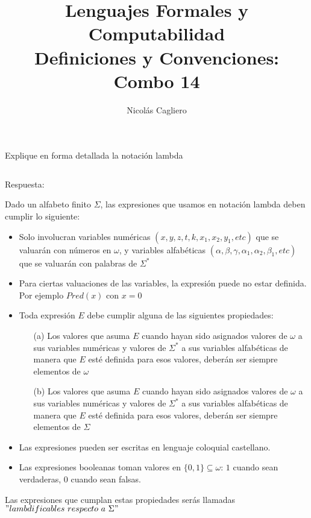 \documentclass{article}
\title{Lenguajes Formales y Computabilidad \\
        \large Definiciones y Convenciones: Combo 14 }
\author{Nicolás Cagliero}
\begin{document}
\maketitle

Explique en forma detallada la notación lambda

\(\)
\begin{center}
    Respuesta: 
    \(\)
\end{center}

Dado un alfabeto finito $\Sigma$, las expresiones que usamos en notación
lambda deben cumplir lo siguiente:
\begin{itemize}
        \item Solo involucran variables numéricas $(x, y, z, t, k, x_1, x_2, y_1, etc)$
        que se valuarán con números en $\omega$, y variables alfabéticas
        $(\alpha, \beta, \gamma, \alpha_1, \alpha_2, \beta_1, etc)$ que se 
        valuarán con palabras de $\Sigma^{*}$
        \item Para ciertas valuaciones de las variables, la expresión puede 
        no estar definida. Por ejemplo $Pred(x)$ con $x = 0$
        \item Toda expresión $E$ debe cumplir alguna de las siguientes propiedades:
        \begin{itemize}
                \item[(a)] Los valores que asuma $E$ cuando hayan sido asignados 
                valores de $\omega$ a sus variables numéricas y valores de $\Sigma^{*}$
                a sus variables alfabéticas de manera que $E$ esté definida para esos valores, 
                deberán ser siempre elementos de $\omega$
                \item[(b)] Los valores que asuma $E$ cuando hayan sido asignados 
                valores de $\omega$ a sus variables numéricas y valores de $\Sigma^{*}$
                a sus variables alfabéticas de manera que $E$ esté definida para esos valores, 
                deberán ser siempre elementos de $\Sigma$
        \end{itemize}
        \item Las expresiones pueden ser escritas en lenguaje coloquial castellano.
        \item Las expresiones booleanas toman valores en $\{0, 1\} \subseteq \omega$: $1$ cuando sean verdaderas, 
        $0$ cuando sean falsas.
   
\end{itemize}

        Las expresiones que cumplan estas propiedades serás llamadas\\
$"lambdificables \text{ } respecto \text{ } a \text{ } \Sigma"$\\
\\
\end{document}
